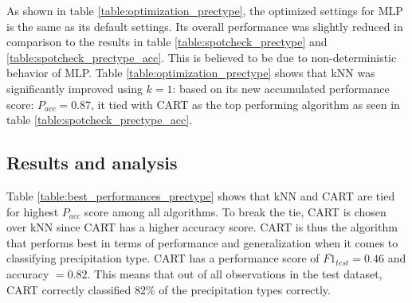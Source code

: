 	As shown in table \ref{table:optimization_prectype}, the optimized settings for MLP is the same as its default settings. Its overall performance was slightly reduced in comparison to the results in table \ref{table:spotcheck_prectype} and \ref{table:spotcheck_prectype_acc}. This is believed to be due to non-deterministic behavior of MLP. Table \ref{table:optimization_prectype} shows that kNN was significantly improved using $k=1$: based on its new accumulated performance score: $P_{acc} = 0.87$, it tied with CART as the top performing algorithm as seen in table \ref{table:spotcheck_prectype_acc}.

	\subsection{Results and analysis} \label{sec:results_prectype}

	\begin{table}[H]
		\centering
		\caption{Shows the overall optimized settings and performances for each of the algorithms in classifiying precipitation type. The best performing algorithms are highlighted.}
	\end{table}

	Table \ref{table:best_performances_prectype} shows that kNN and CART are tied for highest $P_{acc}$ score among all algorithms. To break the tie, CART is chosen over kNN since CART has a higher accuracy score. CART is thus the algorithm that performs best in terms of performance and generalization when it comes to classifying precipitation type. CART has a performance score of $\overline{F1}_{test} = 0.46$ and accuracy $= 0.82$. This means that out of all observations in the test dataset, CART correctly classified 82\% of the precipitation types correctly. 

